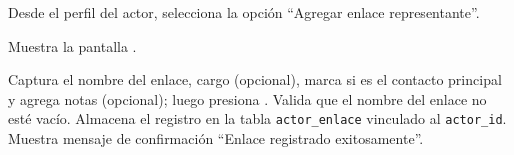 \begin{UCtrayectoria}
	\UCpaso[\UCactor] Desde el perfil del actor, selecciona la opción ``Agregar enlace representante''.
	
	\UCpaso Muestra la pantalla .
	
	
	\UCpaso[\UCactor] \label{CU-45.ingresaEnlace} Captura el nombre del enlace, cargo (opcional), marca si es el contacto principal y agrega notas (opcional); luego presiona .
	\UCpaso Valida que el nombre del enlace no esté vacío. 
	\UCpaso Almacena el registro en la tabla \texttt{actor\_enlace} vinculado al \texttt{actor\_id}.
	\UCpaso Muestra mensaje de confirmación ``Enlace registrado exitosamente''.
\end{UCtrayectoria}


